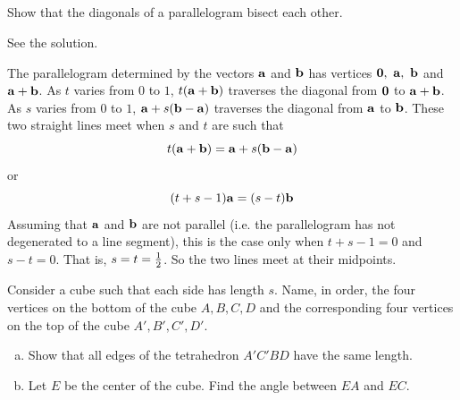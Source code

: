 \subsection*{\Application}

\begin{question}
Show that the diagonals of a parallelogram bisect each other.
\end{question}


\begin{answer}
See the solution.
\end{answer}

\begin{solution}
The parallelogram determined by the vectors $\mathbf{a}$ and $\mathbf{b}$
has vertices $\mathbf{0},\ \mathbf{a},\ \mathbf{b}$ and $\mathbf{a}+\mathbf{b}$.
As $t$ varies from $0$ to $1$, $t(\mathbf{a}+\mathbf{b})$ traverses the
diagonal from $\mathbf{0}$ to $\mathbf{a}+\mathbf{b}$.
As $s$ varies from $0$ to $1$, $\mathbf{a}+s(\mathbf{b}-\mathbf{a})$ traverses the
diagonal from $\mathbf{a}$ to $\mathbf{b}$. These two straight lines meet
when $s$ and $t$ are such that
\begin{equation*}
t(\mathbf{a}+\mathbf{b})=\mathbf{a}+s(\mathbf{b}-\mathbf{a})
\end{equation*}
or
\begin{equation*}
(t+s-1)\mathbf{a}=(s-t)\mathbf{b}
\end{equation*}
Assuming that $\mathbf{a}$ and $\mathbf{b}$ are not parallel (i.e. the parallelogram
has not degenerated to a line segment), this is the case only
when $t+s-1=0$ and $s-t=0$. That is, $s=t=\tfrac{1}{2}$. So the two lines
meet at their midpoints.
\end{solution}

\begin{question}
Consider a cube such that each side has length $s$. Name,
in order, the four vertices on the bottom of the cube $A, B, C, D$ and the
corresponding four vertices on the top of the cube $A', B', C', D'$.
\begin{enumerate}[(a)]
\item 
Show that all edges of the tetrahedron $A'C'BD$ have the same length.
\item
Let $E$ be the center of the cube. Find the angle between $EA$ and $EC$.
\end{enumerate}
\end{question}

%

